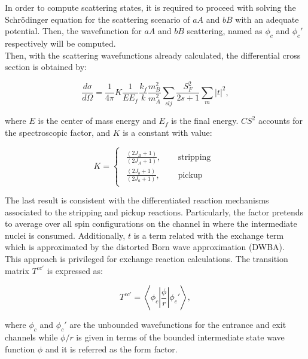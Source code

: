 \documentclass[openany]{book}
\begin{document}
In order to compute scattering states, it is required to proceed with solving the Schrödinger equation for the scattering scenario of $aA$ and $bB$ with an adequate potential. Then, the wavefunction for $aA$ and $bB$ scattering, named as  $\phi_c$ and $\phi_c'$ respectively will be computed. \\

Then, with the scattering wavefunctions already calculated, the differential cross section is obtained by:

\begin{equation} \label{eq:exchange_differential}
	\frac{d\sigma}{d\Omega} = \frac{1}{4\pi} K \frac{1}{E E_f} \frac{k_f}{k}\frac{m^2_B}{m^2_A} \sum_{slj} { \frac{S^2_F}{2s + 1}\sum_{m} |t|^2},
\end{equation}

where $E$ is the center of mass energy and $E_f$ is the final energy.  $CS^2$ accounts for the spectroscopic factor, and $K$ is a constant with value:

\begin{equation} \label{eq:exchange_constant}
	K = 	\left\{\begin{array}{l}
		\begin{split}
			\frac{(2J_B + 1)}{(2J_A + 1)}, \quad &\mathrm{\ stripping} \\ 
			\frac{(2J_b + 1)}{(2J_a + 1)}, \quad &\mathrm{\ pickup}
		\end{split}
	\end{array}\right.
\end{equation}

The last result is consistent with the differentiated reaction mechanisms associated to the stripping and pickup reactions. Particularly, the factor pretends to average over all spin configurations on the channel in where the intermediate nuclei is consumed.  Additionally, $t$ is a term related with the exchange term which is approximated by the distorted Born wave approximation (DWBA). \\

This approach is privileged for exchange reaction calculations. The transition matrix $T^{cc'}$ is expressed as: 

\begin{equation}\label{eq:exchange_matrix}
	T^{cc'} = \left \langle  \phi_c \left| \frac{\phi}{r} \right |  \phi_c' \right \rangle,
\end{equation}

where $\phi_c $ and $\phi_c'$ are the unbounded wavefunctions for the entrance and exit channels while $\phi/r$ is given in terms of the bounded intermediate state wave function $\phi$ and it is referred as the form factor. \\
\end{document}
